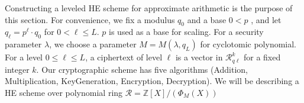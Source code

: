 \documentclass{article}
\begin{document}

\noindent Constructing a leveled HE scheme for approximate arithmetic is the purpose of this section. For convenience, we fix a modulus $q_0$ and a base $0 < p$ , and let $q_\ell=p^\ell \cdot q_0$ for $0<\ell \leq L$. $p$ is used as a base for scaling. For a security parameter $\lambda$, we choose a parameter $M=M\left(\lambda, q_L\right)$ for cyclotomic polynomial. For a level $0 \leq \ell \leq L$, a ciphertext of level $\ell$ is a vector in $\mathcal{R}_{q\ell}^k$ for a fixed integer $k$. Our cryptographic scheme has five algorithms (Addition, Multiplication, KeyGeneration, Encryption, Decryption). We will be describing a HE scheme over polynomial ring $\mathcal{R} = \mathbb{Z}[X] / (\Phi_M(X))$
\\
\end{document}
